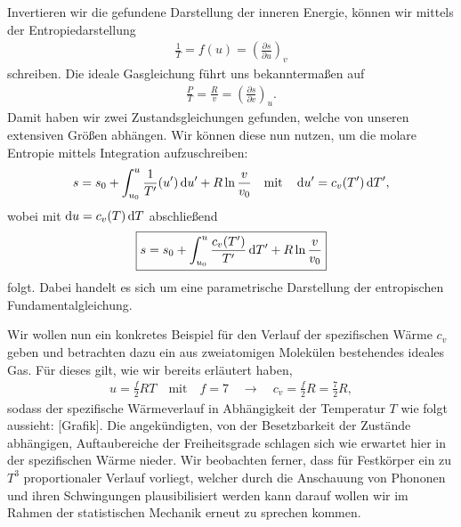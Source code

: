 Invertieren wir die gefundene Darstellung der inneren Energie, können wir mittels der Entropiedarstellung
\begin{align*}
    \frac{1}{T}=f(u)=\left(\frac{\partial s}{\partial u}\right)_v
\end{align*}
schreiben. Die ideale Gasgleichung führt uns bekanntermaßen auf
\begin{align*}
    \frac{P}{T}=\frac{R}{v}=\left(\frac{\partial s}{\partial v}\right)_u.
\end{align*}
Damit haben wir zwei Zustandsgleichungen gefunden, welche von unseren extensiven Größen abhängen.
Wir können diese nun nutzen, um die molare Entropie mittels Integration aufzuschreiben:
\begin{align*}
    s=s_0+\int_{u_0}^u\frac{1}{T'}(u')\mathop{}\!\mathrm{d} u'+R\ln\frac{v}{v_0}\quad\text{mit}\quad\mathop{}\!\mathrm{d} u'=c_v(T')\mathop{}\!\mathrm{d} T',
\end{align*}
wobei mit $\mathop{}\!\mathrm{d} u=c_v(T)\mathop{}\!\mathrm{d} T$ abschließend
\begin{align*}
    \boxed{s=s_0+\int_{u_0}^u\frac{c_v(T')}{T'}\mathop{}\!\mathrm{d} T'+R\ln\frac{v}{v_0}}
\end{align*}
folgt.
Dabei handelt es sich um eine parametrische Darstellung der entropischen Fundamentalgleichung.

Wir wollen nun ein konkretes Beispiel für den Verlauf der spezifischen Wärme $c_v$ geben und betrachten dazu ein aus zweiatomigen Molekülen bestehendes ideales Gas. Für dieses gilt, wie wir bereits erläutert haben,
\begin{align*}
    u=\frac{f}{2}RT\quad\text{mit}\quad f=7\quad\rightarrow\quad c_v=\frac{f}{2}R=\frac{7}{2}R,
\end{align*}
sodass der spezifische Wärmeverlauf in Abhängigkeit der Temperatur $T$ wie folgt aussieht: [Grafik].
Die angekündigten, von der Besetzbarkeit der Zustände abhängigen, Auftaubereiche der Freiheitsgrade schlagen sich wie erwartet hier in der spezifischen Wärme nieder.
Wir beobachten ferner, dass für Festkörper ein zu $T^3$ proportionaler Verlauf vorliegt, welcher durch die Anschauung von Phononen und ihren Schwingungen plausibilisiert werden kann \textendash{} darauf wollen wir im Rahmen der statistischen Mechanik erneut zu sprechen kommen.

